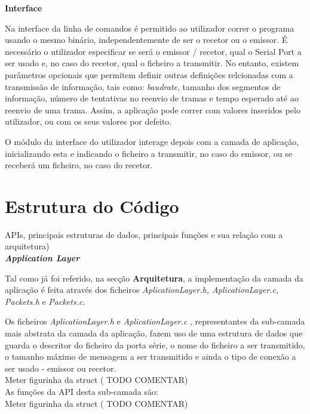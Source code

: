 \documentclass[a4paper, 11pt]{article}
\begin{document}
\large\textbf{Interface}\\
\normalsize

Na interface da linha de comandos é permitido ao utilizador correr o programa usando o mesmo binário, independentemente de ser o recetor ou o emissor.
É necessário o utilizador especificar se será o emissor / recetor, qual o Serial Port a ser usado e, no caso do recetor, qual o ficheiro a transmitir. No entanto, existem parâmetros opcionais que permitem definir outras definições relcionadas com a transmissão de informação, tais como: \textit{baudrate}, tamanho dos segmentos de informação, número de tentativas no reenvio de tramas e tempo esperado até ao reenvio de uma trama.
Assim, a aplicação pode correr com valores inseridos pelo utilizador, ou com os seus valores por defeito.

O módulo da interface do utilizador interage depois com a camada de aplicação, inicializando esta e indicando o ficheiro a transmitir, no caso do emissor, ou se receberá um ficheiro, no caso do recetor.

\newpage

\section{Estrutura do Código}

APIs, principais estruturas de dados, principais funções e sua relação com a arquitetura)\\

\large\textbf{\textit{Application Layer}}\\
\normalsize

Tal como já foi referido, na secção \textbf{Arquitetura}, a implementação da camada da aplicação é feita através dos ficheiros \textit{AplicationLayer.h, AplicationLayer.c, Packets.h} e \textit{Packets.c}.

Os ficheiros \textit{AplicationLayer.h} e \textit{AplicationLayer.c} , representantes da sub-camada mais abstrata da camada da aplicação, fazem uso de uma estrutura de dados que guarda o descritor do ficheiro da porta série, o nome do ficheiro a ser transmitido, o tamanho máximo de mensagem a ser transmitido e ainda o tipo de conexão a ser usado - emissor ou recetor.\\
Meter figurinha da struct ( TODO COMENTAR)\\

As funções da API desta sub-camada são:\\
Meter figurinha da struct ( TODO COMENTAR)\\
\end{document}

